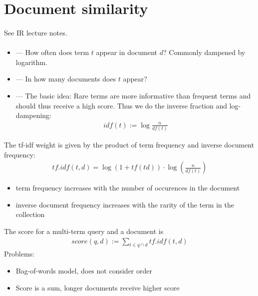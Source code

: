 \documentclass[10pt,twocolumn]{article}
\begin{document}
\section{Document similarity}

\paragraph{} See IR lecture notes.

\paragraph{} \begin{itemize}
\item {} --- How often does term $t$ appear in
  document $d$? Commonly dampened by logarithm.
\item {} --- In how many documents does $t$ appear?
\item {}  ---
  The basic idea: Rare terms are more informative
  than frequent terms and should thus receive a high score.  Thus we do the
  inverse fraction and log-dampening:
  \begin{align*}
    \mathit{idf}(t) := \log \frac{n}{\mathit{df}(t)}
  \end{align*}
\end{itemize}
The tf-idf weight is given by the product of term frequency and inverse document
frequency:
\begin{align*}
  \mathit{tf.idf}(t,d) = \log(1 + \mathit{tf}(td)) \cdot \log \left( \frac{n}{\mathit{df}(t)} \right)
\end{align*}
\begin{itemize}
\item term frequency increases with the number of occurences in the document
\item inverse document frequency increases with the rarity of the term in the collection
\end{itemize}

The score for a multi-term query and a document is
\begin{align*}
  \mathit{score}(q,d) := \sum_{t \in q \cap d} \mathit{tf.idf}(t,d)
\end{align*}
Problems:
\begin{itemize}
\item Bag-of-words model, does not consider order
\item Score is a sum, longer documents receive higher score
\end{itemize}
\end{document}
